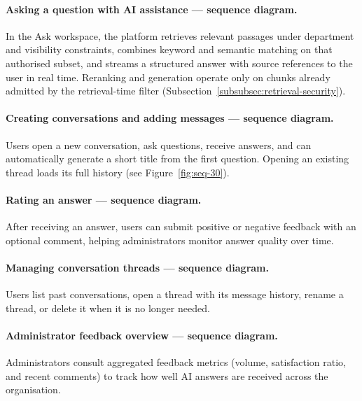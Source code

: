 \paragraph{Asking a question with AI assistance --- sequence diagram.}
In the Ask workspace, the platform retrieves relevant passages under
department and visibility constraints, combines keyword and semantic matching
on that authorised subset, and streams a structured answer with source
references to the user in real time. Reranking and generation operate only on
chunks already admitted by the retrieval-time filter
(Subsection~\ref{subsubsec:retrieval-security}).


\paragraph{Creating conversations and adding messages --- sequence diagram.}
Users open a new conversation, ask questions, receive answers, and can
automatically generate a short title from the first question. Opening an existing
thread loads its full history (see Figure~\ref{fig:seq-30}).

\paragraph{Rating an answer --- sequence diagram.}
After receiving an answer, users can submit positive or negative feedback with an
optional comment, helping administrators monitor answer quality over time.

\paragraph{Managing conversation threads --- sequence diagram.}
Users list past conversations, open a thread with its message history, rename a
thread, or delete it when it is no longer needed.

\paragraph{Administrator feedback overview --- sequence diagram.}
Administrators consult aggregated feedback metrics (volume, satisfaction ratio,
and recent comments) to track how well AI answers are received across the
organisation.

